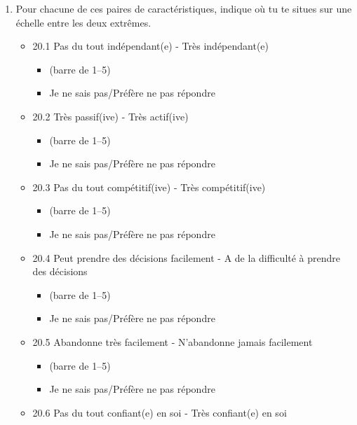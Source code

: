 \documentclass[
  letterpaper,
  DIV=11,
  numbers=noendperiod]{scrreprt}
\providecommand{\tightlist}{%
  \setlength{\itemsep}{0pt}\setlength{\parskip}{0pt}}\usepackage{longtable,booktabs,array}
\begin{document}
\begin{enumerate}
\def\labelenumi{\arabic{enumi}.}
\setcounter{enumi}{19}
\item
  Pour chacune de ces paires de caractéristiques, indique où tu te
  situes sur une échelle entre les deux extrêmes.

  \begin{itemize}
  \tightlist
  \item
    20.1 Pas du tout indépendant(e) - Très indépendant(e)

    \begin{itemize}
    \tightlist
    \item
      (barre de 1--5)
    \item
      Je ne sais pas/Préfère ne pas répondre
    \end{itemize}
  \item
    20.2 Très passif(ive) - Très actif(ive)

    \begin{itemize}
    \tightlist
    \item
      (barre de 1--5)
    \item
      Je ne sais pas/Préfère ne pas répondre
    \end{itemize}
  \item
    20.3 Pas du tout compétitif(ive) - Très compétitif(ive)

    \begin{itemize}
    \tightlist
    \item
      (barre de 1--5)
    \item
      Je ne sais pas/Préfère ne pas répondre
    \end{itemize}
  \item
    20.4 Peut prendre des décisions facilement - A de la difficulté à
    prendre des décisions

    \begin{itemize}
    \tightlist
    \item
      (barre de 1--5)
    \item
      Je ne sais pas/Préfère ne pas répondre
    \end{itemize}
  \item
    20.5 Abandonne très facilement - N'abandonne jamais facilement

    \begin{itemize}
    \tightlist
    \item
      (barre de 1--5)
    \item
      Je ne sais pas/Préfère ne pas répondre
    \end{itemize}
  \item
    20.6 Pas du tout confiant(e) en soi - Très confiant(e) en soi


\end{itemize}
\end{enumerate}
\end{document}
